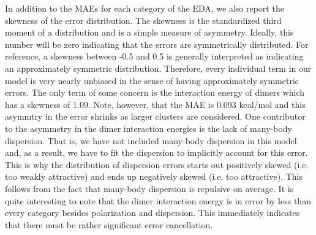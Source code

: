 \documentclass[journal=jctcce,manuscript=article]{achemso}
\begin{document}
In addition to the MAEs for each category of the EDA, we also report the skewness of the error distribution. The skewness is the standardized third moment of a distribution and is a simple measure of asymmetry. Ideally, this number will be zero indicating that the errors are symmetrically distributed. For reference, a skewness between -0.5 and 0.5 is generally interpreted as indicating an approximately symmetric distribution. Therefore, every individual term in our model is very nearly unbiased in the sense of having approximately symmetric errors. The only term of some concern is the interaction energy of dimers which has a skewness of 1.09. Note, however, that the MAE is 0.093 kcal/mol and this asymmtry in the error shrinks as larger clusters are considered. One contributor to the asymmetry in the dimer interaction energies is the lack of many-body dispersion. That is, we have not included many-body dispersion in this model and, as a result, we have to fit the dispersion to implicitly account for this error. This is why the distribution of dispersion errors starts out positively skewed (i.e. too weakly attractive) and ends up negatively skewed (i.e. too attractive). This follows from the fact that many-body dispersion is repulsive on average. It is quite interesting to note that the dimer interaction energy is in error by less than every category besides polarization and dispersion. This immediately indicates that there must be rather significant error cancellation.
\end{document}
